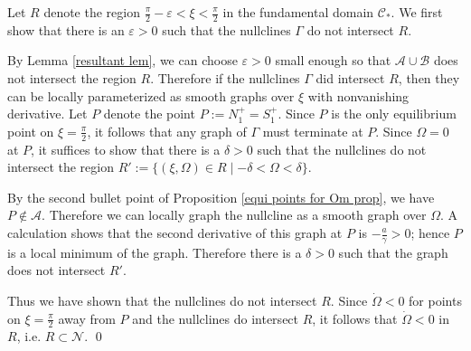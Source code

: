 \documentclass[11 pt]{article}
\renewcommand\({\left(}
\renewcommand\){\right)}
\newcommand\e{\varepsilon}
\newcommand\<{\langle}
\renewcommand\>{\rangle}
\newcommand\8{\infty}
\newcommand{\mc}{\mathcal}
\begin{document}
\proof

Let $R$ denote the region $\frac{\pi}{2} - \e < \xi < \frac{\pi}{2}$ in the fundamental domain $\mc{C}_*$. We first show that there is an $\e > 0$ such that the nullclines $\Gamma$ do not intersect $R$. 

By Lemma \ref{resultant lem}, we can choose $\e > 0$ small enough so that $\mc{A} \cup \mc{B}$ does not intersect the region $R$. Therefore if the nullclines $\Gamma$ did intersect $R$, then they can be locally parameterized as smooth graphs over $\xi$ with nonvanishing derivative. Let $P$ denote the point $P := N^+_1 = S^+_1$. Since $P$ is the only equilibrium point on $\xi = \frac{\pi}{2}$, it follows that any graph of $\Gamma$ must terminate at $P$. Since $\Omega = 0$ at $P$, it suffices to show that there is a $\delta > 0$ such that the nullclines do not intersect the region $R' := \{(\xi, \Omega) \in R \mid -\delta < \Omega < \delta\}$. 

By the second bullet point of Proposition \ref{equi points for Om prop}, we have $P \notin \mc{A}$. Therefore we can locally graph the nullcline as a smooth graph over $\Omega$. A calculation shows that the second derivative of this graph at $P$ is $-\frac{a}{\gamma} > 0$; hence $P$ is a local minimum of the graph. Therefore there is a $\delta > 0$ such that the graph does not intersect $R'$.

Thus we have shown that the nullclines do not intersect $R$. Since $\dot{\Omega} < 0$ for points on $\xi = \frac{\pi}{2}$ away from $P$ and the nullclines do intersect $R$, it follows that $\dot{\Omega} < 0$ in $R$, i.e. $R \subset \mc{N}$. 
\qed

\medskip
\medskip
\end{document}
